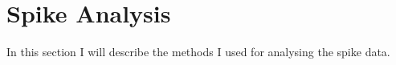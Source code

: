 \section{Spike Analysis}
In this section I will describe the methods I used for analysing the spike data.

